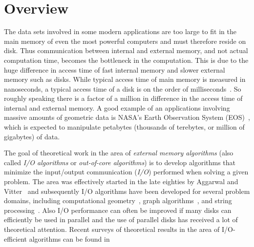 \chapter{Overview}

The data sets involved in some modern applications are too large to
fit in the main memory of even the most powerful computers and must therefore
reside on disk. Thus communication between internal and external memory,
and not actual computation time, becomes the bottleneck in the
computation. This is due to the huge difference in access time of fast
internal memory and slower external memory such as disks. While typical
access time of main memory is measured in nanoseconds, a typical access
time of a disk is on the order of milliseconds~\cite{cockcroft:sun}. So
roughly speaking there is a factor of a million in difference in the access
time of internal and external memory. A good example of an applications
involving massive amounts of geometric data is NASA's Earth Observation
System (EOS)~\cite{cromp,kobler:nasa}, which is expected to manipulate
petabytes (thousands of terebytes, or million of gigabytes) of data.

The goal of theoretical work in the area of {\em external memory
algorithms\/} (also called {\em I/O algorithms\/} or {\em out-of-core
algorithms}) is to develop algorithms that minimize the input/output
communication ({\em I/O}) performed when solving a given
problem. The area was effectively started in the late eighties by Aggarwal
and Vitter~\cite{aggarwal:input} and subsequently I/O algorithms have been
developed for several problem domains, including computational
geometry~\cite{goodrich:external,arge:buffer,arge:theory,arge:gis,aamvv-empgbtag97,arge:interval,kanellakis:indexing,ramaswamy:path,subramanian:p-range,vengroff:efficient,agarwal:efficient,zhu:further,agarwal:point,arge:scalable,arge:theory,callahan:topology,franciosa:orders,grossi:cross-tree,zhu:further},
 graph
algorithms~\cite{chiang:external,arge:buffer,kumar:improved,abello:functional,crauser:randomized,arge:obdd,feuerstein:memory,nodine:blocking,ullman:input},
 and string
processing~\cite{ferragina:fully,ferragina:fast,arge:strings,crauser:construction}.
Also I/O performance can often be improved if many disks can efficiently be
used in parallel and the use of parallel disks
 has received a lot of
theoretical attention. Recent surveys of theoretical
results in the area of I/O-efficient algorithms can be found
in~\cite{arge:gisbook,arge:thesis,vitter:podssurvey,vitter:extdatassurvey}

